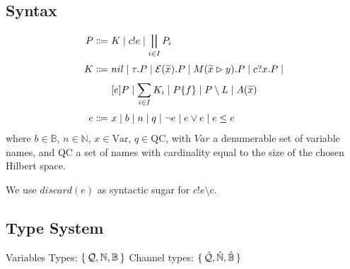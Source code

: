 \subsection{Syntax}
\begin{align*}
  P \Coloneqq &\ K \mid c!e 
  \mid \bigparallel_{i \in I} P_i \\[0.1cm]
  K \Coloneqq &\ nil \mid \tau . P \mid \mathcal{E}(\widetilde{x}) . P \mid M(\widetilde{x} \rhd y) . P \mid c?x . P \mid \\[0.1cm]
              &\ [e] P \mid \sum_{i \in I} K_i \mid P \{f\} \mid P \setminus L \mid A(\widetilde{x}) \\[0.1cm]
  e \Coloneqq &\ x \mid b \mid n \mid q \mid \neg e \mid e \lor e \mid e \leq e
\end{align*}	
where $b \in \mathbb{B}$, $n \in \mathbb{N}$, $x \in \text{Var}$, $q \in \text{QC}$, with $Var$ a denumerable set of variable names, and
QC a set of names with cardinality equal to the size of the chosen Hilbert space.

We use $discard(e)$ as syntactic sugar for $c!e \setminus c$.

\subsection{Type System}

Variables Types: $\set{\mathcal{Q}, \mathbb{N}, \mathbb{B}}$
Channel types: $\set{\hat{\mathcal{Q}}, \hat{\mathbb{N}}, \hat{\mathbb{B}}}$

